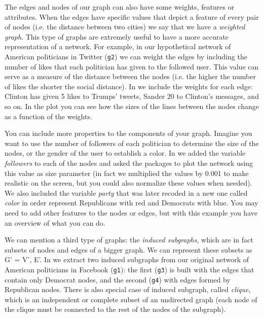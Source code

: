 
The edges and nodes of our graph can also have some weights, features or attributes. When the edges have specific values that depict a feature of every pair of nodes (i.e. the distance between two cities) we say that we have a \textit{weighted graph}. This type of graphs are extremely useful to have a more accurate representation of a network. For example, in our hypothetical network of American politicians in Twitter (\texttt{g2}) we can weight the edges by including the number of likes that each politician has given to the followed user. This value  can serve as a measure of the distance between the nodes (i.e. the higher the number of likes the shorter the social distance). In  we include the weights for each edge: Clinton has given 5 likes to Trumps' tweets, Sander 20 to Clinton's messages, and so on. In the plot you can see how the sizes of the lines between the nodes change as a function of the weights.


You can include more properties to the components of your graph. Imagine you want to use the number of followers of each politician to determine the size of the nodes, or the gender of the user to establish a color. In  we added the variable \emph{followers} to each of the nodes and asked the packages to plot the network using this value as size parameter (in fact we multiplied the values by 0.001 to make realistic on the screen, but you could also normalize these values when needed). We also included the variable \emph{party} that was later recoded in a new one called \emph{color} in order represent Republicans with red and Democrats with blue.  You may need to add other features to the nodes or edges, but with this example you have an overview of what you can do.


We can  mention a third type of graphs: the \textit{induced subgraphs}, which are in fact subsets of nodes and edges of a bigger graph. We can represent these subsets as G' = V', E'. In  we extract two induced subgraphs from our original network of American politicians in Facebook (\texttt{g1}): the first (\texttt{g3}) is built with the edges that contain only Democrat nodes, and the second (\texttt{g4}) with edges formed by Republican nodes. There is also special case of induced subgraph, called \textit{clique}, which is an independent or complete subset of an undirected graph (each node of the clique must be connected to the rest of the nodes of the subgraph).

